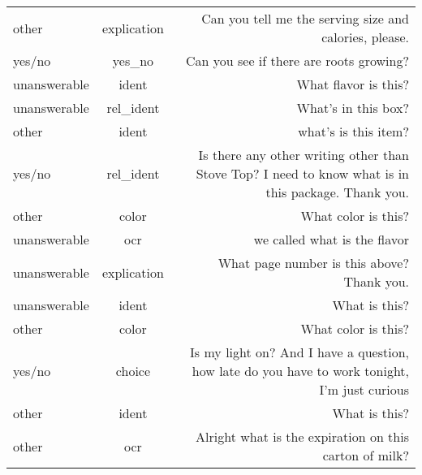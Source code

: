 \begin{table}[!th]
{\begin{tabular}{lcr}
			other        & explication & Can you tell me the serving size and calories, please.                                                             \\
			yes/no       & yes\_no     & Can you see if there are roots growing?                                                                            \\
			unanswerable & ident       & What flavor is this?                                                                                               \\
			unanswerable & rel\_ident  & What's in this box?                                                                                                \\
			other        & ident       & what's is this item?                                                                                               \\
			yes/no       & rel\_ident  & Is there any other writing other than Stove Top? I need to know what is in this package. Thank you.                \\
			other        & color       & What color is this?                                                                                                \\
			unanswerable & ocr         & we called what is the flavor                                                                                       \\
			unanswerable & explication & What page number is this above? Thank you.                                                                         \\
			unanswerable & ident       & What is this?                                                                                                      \\
			other        & color       & What color is this?                                                                                                \\
			yes/no       & choice      & Is my light on?  And I have a question, how late do you have to work tonight, I'm just curious                     \\
			other        & ident       & What is this?                                                                                                      \\
			other        & ocr         & Alright what is the expiration on this carton of milk?                                                             \\

\end{tabular}}
\end{table}
